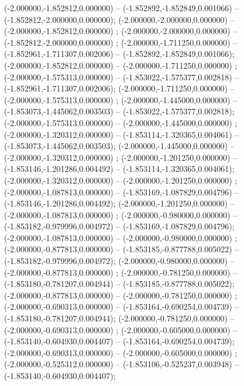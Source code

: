  (-2.000000,-1.852812,0.000000) -- (-1.852892,-1.852849,0.001066) -- (-1.852812,-2.000000,0.000000);
 (-2.000000,-2.000000,0.000000) -- (-2.000000,-1.852812,0.000000) ;
 (-2.000000,-2.000000,0.000000) -- (-1.852812,-2.000000,0.000000) ;
 (-2.000000,-1.711250,0.000000) -- (-1.852961,-1.711307,0.002006) -- (-1.852892,-1.852849,0.001066);
 (-2.000000,-1.852812,0.000000) -- (-2.000000,-1.711250,0.000000) ;
 (-2.000000,-1.575313,0.000000) -- (-1.853022,-1.575377,0.002818) -- (-1.852961,-1.711307,0.002006);
 (-2.000000,-1.711250,0.000000) -- (-2.000000,-1.575313,0.000000) ;
 (-2.000000,-1.445000,0.000000) -- (-1.853073,-1.445062,0.003503) -- (-1.853022,-1.575377,0.002818);
 (-2.000000,-1.575313,0.000000) -- (-2.000000,-1.445000,0.000000) ;
 (-2.000000,-1.320312,0.000000) -- (-1.853114,-1.320365,0.004061) -- (-1.853073,-1.445062,0.003503);
 (-2.000000,-1.445000,0.000000) -- (-2.000000,-1.320312,0.000000) ;
 (-2.000000,-1.201250,0.000000) -- (-1.853146,-1.201286,0.004492) -- (-1.853114,-1.320365,0.004061);
 (-2.000000,-1.320312,0.000000) -- (-2.000000,-1.201250,0.000000) ;
 (-2.000000,-1.087813,0.000000) -- (-1.853169,-1.087829,0.004796) -- (-1.853146,-1.201286,0.004492);
 (-2.000000,-1.201250,0.000000) -- (-2.000000,-1.087813,0.000000) ;
 (-2.000000,-0.980000,0.000000) -- (-1.853182,-0.979996,0.004972) -- (-1.853169,-1.087829,0.004796);
 (-2.000000,-1.087813,0.000000) -- (-2.000000,-0.980000,0.000000) ;
 (-2.000000,-0.877813,0.000000) -- (-1.853185,-0.877788,0.005022) -- (-1.853182,-0.979996,0.004972);
 (-2.000000,-0.980000,0.000000) -- (-2.000000,-0.877813,0.000000) ;
 (-2.000000,-0.781250,0.000000) -- (-1.853180,-0.781207,0.004944) -- (-1.853185,-0.877788,0.005022);
 (-2.000000,-0.877813,0.000000) -- (-2.000000,-0.781250,0.000000) ;
 (-2.000000,-0.690313,0.000000) -- (-1.853164,-0.690254,0.004739) -- (-1.853180,-0.781207,0.004944);
 (-2.000000,-0.781250,0.000000) -- (-2.000000,-0.690313,0.000000) ;
 (-2.000000,-0.605000,0.000000) -- (-1.853140,-0.604930,0.004407) -- (-1.853164,-0.690254,0.004739);
 (-2.000000,-0.690313,0.000000) -- (-2.000000,-0.605000,0.000000) ;
 (-2.000000,-0.525312,0.000000) -- (-1.853106,-0.525237,0.003948) -- (-1.853140,-0.604930,0.004407);
